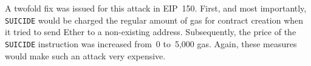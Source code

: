A twofold fix was issued for this attack in EIP~150. First, and most importantly, \lstinline{SUICIDE} would be charged the regular amount of gas for contract creation when it tried to send Ether to a non-existing address. Subsequently, the price of the \lstinline{SUICIDE} instruction was increased from~0 to~5,000 gas. Again, these measures would make such an attack very expensive.
